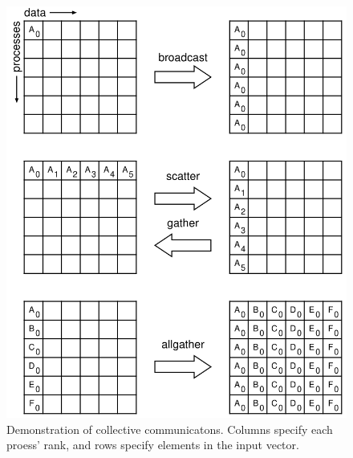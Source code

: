 \begin{figure}[h]
	\centering
	\includegraphics[width = 4.5in]{3_Chapters/2_Chapter_Background/Figs/mpispec_collective.png}
	\caption{Demonstration of collective communicatons. Columns specify each proess' rank, and rows specify elements in the input vector.}
	\label{fig:mpispec_collectives}
\end{figure}